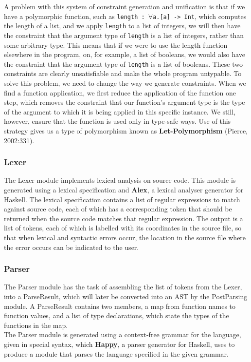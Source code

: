 \documentclass{article}
\begin{document}
A problem with this system of constraint generation and unification is that if we have a polymorphic function, such as \texttt{length : $\forall$a.[a] -> Int}, which computes the length of a list, and we apply \texttt{length} to a list of integers, we will then have the constraint that the argument type of \texttt{length} is a list of integers, rather than some arbitrary type. This means that if we were to use the length function elsewhere in the program, on, for example, a list of booleans, we would also have the constraint that the argument type of \texttt{length} is a list of booleans. These two constraints are clearly unsatisfiable and make the whole program untypable. To solve this problem, we need to change the way we generate constraints. When we find a function application, we first reduce the application of the function one step, which removes the constraint that our function's argument type is the type of the argument to which it is being applied in this specific instance. We still, however, ensure that the function is used only in type-safe ways. Use of this strategy gives us a type of polymorphism known as \textbf{Let-Polymorphism} (Pierce, 2002:331).

\subsubsection{Lexer}
The Lexer module implements lexical analysis on source code. This module is generated using a lexical specification and \textbf{Alex}, a lexical analyser generator for Haskell. The lexical specification contains a list of regular expressions to match against source code, each of which has a corresponding token that should be returned when the source code matches that regular expression. The output is a list of tokens, each of which is labelled with its coordinates in the source file, so that when lexical and syntactic errors occur, the location in the source file where the error occurs can be indicated to the user.
\subsubsection{Parser}
The Parser module has the task of assembling the list of tokens from the Lexer, into a ParseResult, which will later be converted into an AST by the PostParsing module. A ParseResult contains two members, a map from function names to function values, and a list of type declarations, which state the types of the functions in the map.
\\\indent The Parser module is generated using a context-free grammar for the language, given in special syntax, which \textbf{Happy}, a parser generator for Haskell, uses to produce a module that parses the language specified in the given grammar.
\end{document}
